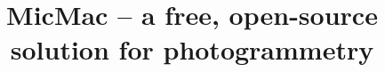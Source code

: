 \documentclass[twocolumn]{bmcart}%
\begin{document}
\begin{frontmatter}

\begin{fmbox}


\title{MicMac -- a free, open-source solution for photogrammetry}


\author[
   addressref={aff1},                   %
   corref={aff1},                       %
   noteref={n1},                        %
   email={ewelina.rupnik@ensg.eu}   %
]{ }
\author[
   addressref={aff1,aff2},
   email={?}
]{ }
\author[
   addressref={aff1,aff2},
   email={Marc.Pierrot-Deseilligny@ensg.eu}
]{ }

\address[id=aff1]{%
  , %
  ,                     %
  ,                              %
}
\address[id=aff2]{%
  ,
  ,
  ,
}


\end{fmbox}
\end{frontmatter}
\end{document}
